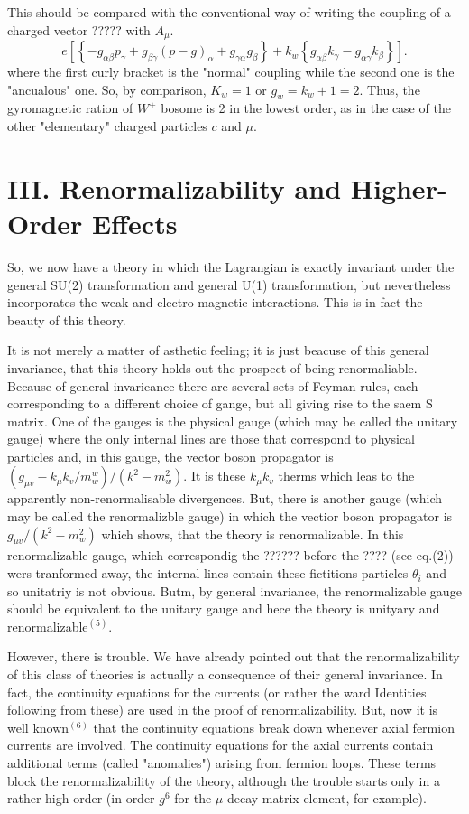 This should be compared with the conventional way of writing the coupling of a charged vector ????? with $A_{\mu}$.
$$
e\left[\left\{-g_{\alpha \beta} p_{\gamma} + g_{\beta \gamma}(p-g)_{\alpha} + g_{\gamma \alpha} g_{\beta}\right\} + k_{w} \left\{g_{\alpha \beta} k_{\gamma} - g_{\alpha \gamma} k_{\beta} \right\}\right].
$$
where the first curly bracket is the "normal" coupling while the second one is the "ancualous" one. So, by comparison, $K_{w} = 1$ or $g_{w}= k_{w} + 1 = 2$. Thus, the gyromagnetic ration of $W^{\pm}$ bosome is 2 in the lowest order, as in the case of the other "elementary" charged particles $c$ and $\mu$.

\section*{III. Renormalizability and Higher-Order Effects}

So, we now have a theory in which the Lagrangian is exactly invariant under the general SU(2) transformation and general U(1) transformation, but nevertheless incorporates the weak and electro magnetic interactions. This is in fact the beauty of this theory.

It is not merely a matter of asthetic feeling; it is just beacuse of this general invariance, that this theory holds out the prospect of being renormaliable. Because of general invarieance there are several sets of Feyman rules, each corresponding to a different choice of gange, but all giving rise to the saem S matrix. One of the gauges is the physical gauge (which may be called the unitary gauge) where the only internal lines are those that correspond  to physical particles and, in this gauge, the vector boson propagator is $(g_{\mu v} - k_{\mu} k_{v}/m^{w}_{w})/(k^{2}-m^{2}_{w})$. It is these $k_{\mu} k_{v}$ therms which leas to the apparently non-renormalisable divergences. But, there is another gauge (which may be called the renormalizble gauge) in which the vectior boson propagator is $g_{\mu v}/(k^{2}-m_{w}^{2})$ which shows, that the theory is renormalizable. In this renormalizable gauge, which correspondig the ?????? before the ???? (see eq.(2)) wers tranformed away, the internal lines contain these fictitions particles $\theta_{i}$ and so unitatriy is not obvious. Butm, by general invariance, the renormalizable gauge should be equivalent to the unitary gauge and hece the theory is unityary and renormalizable$^{(5)}$.

However, there is trouble. We have already pointed out that the renormalizability of this class of theories is actually a consequence of their  general invariance. In fact, the continuity equations for the currents (or rather the ward Identities following from these) are used in the proof of renormalizability. But, now it is well known$^{(6)}$ that the continuity equations break down whenever axial fermion currents are involved. The continuity equations for the axial currents contain additional terms (called "anomalies") arising from fermion loops. These terms block the renormalizability of the theory, although the trouble starts only in a rather high order (in order $g^{6}$ for the $\mu$ decay matrix element, for example).

